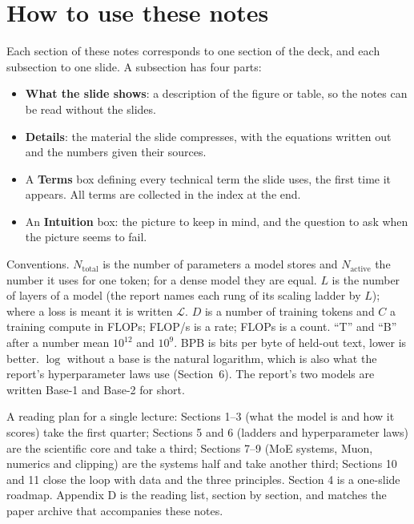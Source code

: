 \documentclass[11pt,letterpaper]{article}
\newcommand{\Nact}{N_{\mathrm{active}}}
\newcommand{\Ntot}{N_{\mathrm{total}}}\newcommand{\Neff}{N_{\mathrm{eff}}}
\begin{document}
\tableofcontents
\clearpage

\section*{How to use these notes}
Each section of these notes corresponds to one section of the deck, and each subsection to one slide. A subsection has four parts:
\begin{itemize}
  \item \textbf{What the slide shows}: a description of the figure or table, so the notes can be read without the slides.
  \item \textbf{Details}: the material the slide compresses, with the equations written out and the numbers given their sources.
  \item A \textbf{Terms} box defining every technical term the slide uses, the first time it appears. All terms are collected in the index at the end.
  \item An \textbf{Intuition} box: the picture to keep in mind, and the question to ask when the picture seems to fail.
\end{itemize}
Conventions. $\Ntot$ is the number of parameters a model stores and $\Nact$ the number it uses for one token; for a dense model they are equal. $L$ is the number of layers of a model (the report names each rung of its scaling ladder by $L$); where a loss is meant it is written $\mathcal{L}$. $D$ is a number of training tokens and $C$ a training compute in FLOPs; FLOP/s is a rate; FLOPs is a count. ``T'' and ``B'' after a number mean $10^{12}$ and $10^{9}$. BPB is bits per byte of held-out text, lower is better. $\log$ without a base is the natural logarithm, which is also what the report's hyperparameter laws use (Section~6). The report's two models are written Base-1 and Base-2 for short.

A reading plan for a single lecture: Sections 1--3 (what the model is and how it scores) take the first quarter; Sections 5 and 6 (ladders and hyperparameter laws) are the scientific core and take a third; Sections 7--9 (MoE systems, Muon, numerics and clipping) are the systems half and take another third; Sections 10 and 11 close the loop with data and the three principles. Section 4 is a one-slide roadmap. Appendix D is the reading list, section by section, and matches the paper archive that accompanies these notes.
\end{document}
